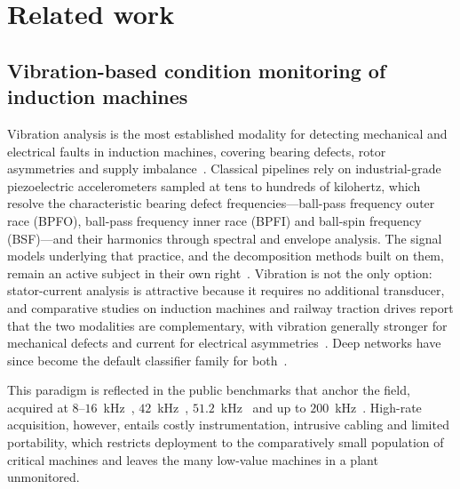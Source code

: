 \providecommand{\cmark}{\ding{51}}
\providecommand{\xmark}{\ding{55}}
\providecommand{\pmark}{$\sim$}

\section{Related work}
\label{sec:related}

\subsection{Vibration-based condition monitoring of induction machines}
Vibration analysis is the most established modality for detecting mechanical and
electrical faults in induction machines, covering bearing defects, rotor
asymmetries and supply imbalance~\cite{gangsar2020signal, hamani2025advancements}.
Classical pipelines rely on industrial-grade piezoelectric accelerometers sampled
at tens to hundreds of kilohertz, which resolve the characteristic bearing defect
frequencies---ball-pass frequency outer race (BPFO), ball-pass frequency inner
race (BPFI) and ball-spin frequency (BSF)---and their harmonics through spectral
and envelope analysis. The signal models underlying that practice, and the
decomposition methods built on them, remain an active subject in their own
right~\cite{liu2026cm, li2024cm}. Vibration is not the only option: stator-current
analysis is attractive because it requires no additional transducer, and
comparative studies on induction machines and railway traction drives report that
the two modalities are complementary, with vibration generally stronger for
mechanical defects and current for electrical asymmetries~\cite{ayankoso2024cm,
sun2022cm}. Deep networks have since become the default classifier family for
both~\cite{yang2021fault, zhang2020deep, guo2024cm, chen2026cm}.

This paradigm is reflected in the public benchmarks that anchor the field,
acquired at $8$--$16$~kHz~\cite{lee2024multidomain}, $42$~kHz~\cite{sehri2024ottawa},
$51.2$~kHz~\cite{thuan2023hust} and up to $200$~kHz~\cite{huang2018bearing}.
High-rate acquisition, however, entails costly instrumentation, intrusive cabling
and limited portability, which restricts deployment to the comparatively small
population of critical machines and leaves the many low-value machines in a plant
unmonitored.

